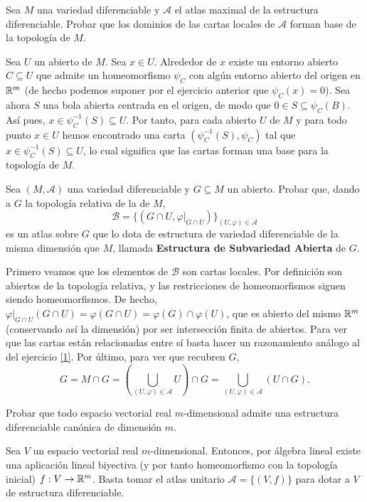 \documentclass[twoside]{article}
\begin{document}
\begin{ejercicio}{3}
Sea $M$ una variedad diferenciable y $\mathcal{A}$ el atlas maximal de la estructura
diferenciable. Probar que los dominios de las cartas locales de $\mathcal{A}$ forman
base de la topología de $M$.
\end{ejercicio}
\begin{solucion}
Sea $U$ un abierto de $M$. Sea $x\in U$. Alrededor de $x$ existe un entorno abierto $C\subseteq U$ que admite un homeomorfismo $\psi_C$ con algún entorno abierto del origen en $\mathbb{R}^m$ (de hecho podemos suponer por el ejercicio anterior que $\psi_C(x)=0$). Sea ahora $S$ una bola abierta centrada en el origen, de modo que $0\in S\subseteq \psi_C(B)$. Así pues, $x\in\psi_C^{-1}(S)\subseteq U$. Por tanto, para cada abierto $U$ de $M$ y para todo punto $x\in U$ hemos encontrado una carta $(\psi_C^{-1}(S),\psi_C)$ tal que $x\in\psi_C^{-1}(S)\subseteq U$, lo cual significa que las cartas forman una base para la topología de $M$.
\end{solucion}

\begin{ejercicio}{4}
Sea $(M,\mathcal{A})$ una variedad diferenciable y $G\subseteq M$ un abierto. Probar que,
dando a $G$ la topología relativa de la de $M$,
$$\mathcal{B} = \{(G \cap U, \varphi|_{G\cap U})\}_{(U,\varphi)\in\mathcal{A}}$$
es un atlas sobre $G$ que lo dota de estructura de variedad diferenciable de la
misma dimensión que $M$, llamada \textbf{Estructura de Subvariedad Abierta}
de $G$.
\end{ejercicio}
\begin{solucion}
Primero veamos que los elementos de $\mathcal{B}$ son cartas locales. Por definición son abiertos de la topología relativa, y las restricciones de homeomorfismos siguen siendo homeomorfismos. De hecho, $\varphi|_{G\cap U}(G\cap U)=\varphi(G\cap U)=\varphi(G)\cap\varphi(U)$, que es abierto del mismo $\mathbb{R}^m$ (conservando así la dimensión) por ser intersección finita de abiertos. Para ver que las cartas están relacionadas entre sí basta hacer un razonamiento  análogo al del ejercicio \ref{1}. Por último, para ver que recubren $G$, 
$$G=M\cap G=(\bigcup_{(U,\varphi)\in\mathcal{A}}U)\cap G= \bigcup_{(U,\varphi)\in\mathcal{A}}(U\cap G).$$
\end{solucion}

\begin{ejercicio}{5}
Probar que todo espacio vectorial real $m$-dimensional admite una estructura
diferenciable canónica de dimensión $m$.
\end{ejercicio}
\begin{solucion}
Sea $V$ un espacio vectorial real $m$-dimensional. Entonces, por álgebra lineal existe una aplicación lineal biyectiva (y por tanto homeomorfismo con la topología inicial) $f:V\to\mathbb{R}^m$. Basta tomar el atlas unitario $\mathcal{A}=\{(V,f)\}$ para dotar a $V$ de estructura diferenciable.  
\end{solucion}
\end{document}
